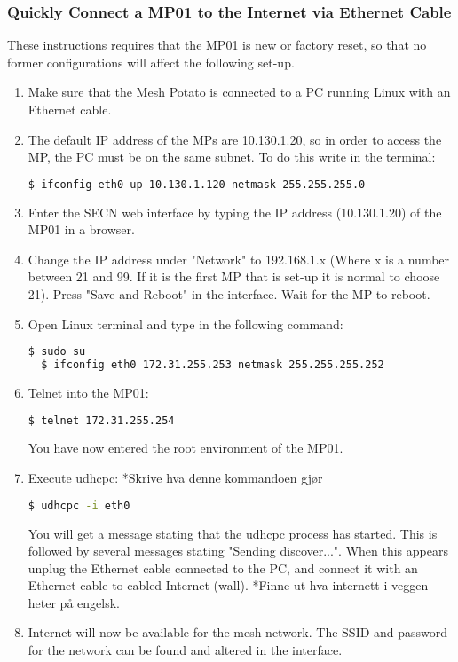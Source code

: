 \subsubsection{Quickly Connect a MP01 to the Internet via Ethernet Cable}

These instructions requires that the MP01 is new or factory reset, so that no former configurations will affect the following set-up. 

\begin{enumerate}
\item Make sure that the Mesh Potato is connected to a PC running Linux with an Ethernet cable. 
\item The default IP address of the MPs are 10.130.1.20, so in order to access the MP, the PC must be on the same subnet. To do this write in the terminal: 
\noindent
\begin{lstlisting}[language=bash]
  $ ifconfig eth0 up 10.130.1.120 netmask 255.255.255.0
\end{lstlisting}
\item Enter the SECN web interface by typing the IP address (10.130.1.20) of the MP01 in a browser. 
\item Change the IP address under "Network" to 192.168.1.x (Where x is a number between 21 and 99. If it is the first MP that is set-up it is normal to choose 21). Press "Save and Reboot" in the interface. Wait for the MP to reboot. 
\item Open Linux terminal and type in the following command: 
\noindent
\begin{lstlisting}[language=bash]
  $ sudo su
  $ ifconfig eth0 172.31.255.253 netmask 255.255.255.252 
\end{lstlisting}
\item Telnet into the MP01:
\noindent
\begin{lstlisting}[language=bash]
  $ telnet 172.31.255.254 
\end{lstlisting}
You have now entered the root environment of the MP01. 
\item Execute udhcpc: 
*Skrive hva denne kommandoen gjør
\noindent
\begin{lstlisting}[language=bash]
  $ udhcpc -i eth0 
\end{lstlisting}
You will get a message stating that the udhcpc process has started. This is followed by several messages stating "Sending discover...". When this appears unplug the Ethernet cable connected to the PC, and connect it with an Ethernet cable to cabled Internet (wall). 
*Finne ut hva internett i veggen heter på engelsk.
\item Internet will now be available for the mesh network. The SSID and password for the network can be found and altered in the interface. 
\end{enumerate}

